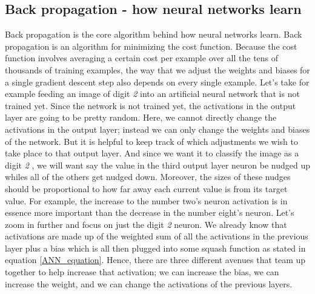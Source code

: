 \documentclass[master]{thesis-uestc}
\begin{document}
\subsection{Back propagation - how neural networks learn}
Back propagation is the core algorithm behind how neural networks learn. Back propagation is an algorithm for minimizing the cost function. Because the cost function involves averaging a certain cost per example over all the tens of thousands of training examples, the way that we adjust the weights and biases for a single gradient descent step also depends on every single example. Let's take for example feeding an image of digit \textit{2}  into an artificial neural network that is not trained yet. Since the network is not trained yet, the activations in the output layer are going to be pretty random. Here, we cannot directly change the activations in the output layer; instead we can only change the weights and biases of the network. But it is helpful to keep track of which adjustments we wish to take place to that output layer. And since we want it to classify the image as a digit \textit{2} , we will want say the value in the third output layer neuron be nudged up whiles all of the others get nudged down. Moreover, the sizes of these nudges should be proportional to how far away each current value is from its target value. For example, the increase to the number two's neuron activation is in essence more important than the decrease in the number eight's neuron. Let's zoom in further and focus on just the digit \textit{2} neuron. We already know that activations are made up of the weighted sum of all the activations in the previous layer plus a bias which is all then plugged into some squash function as stated in equation \ref{ANN_equation}. Hence, there are three different avenues that team up together to help increase that activation; we can increase the bias, we can increase the weight, and we can change the activations of the previous layers.
\end{document}
